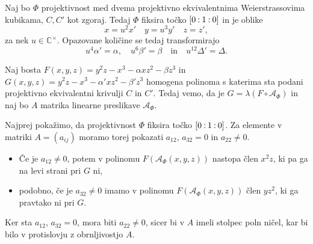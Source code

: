 \documentclass[mat1]{fmfdelo}
\newcommand{\CM}{\mathbb C ^\times}
\newcommand{\linphi}{\mathcal{A}_\Phi}
\newcommand{\oio}{\pcoor{0: 1 : 0}}
\newcommand{\pcoor}[1]{%
  \begingroup\lccode`~=`: \lowercase{\endgroup
  \edef~}{\mathbin{\mathchar\the\mathcode`:}\nobreak}%
  [%
  \begingroup
  \mathcode`:=\string"8000
  #1%
  \endgroup
  ]%
}
\theoremstyle{definition}
\begin{document}
\begin{lema}
    \label{projektivnosti wnf}
    Naj bo $\Phi$ projektivnost med dvema projektivno ekvivalentnima Weierstrassovima kubikama, $C, C'$ kot zgoraj. Tedaj $\Phi$ fiksira točko $\pcoor{0 : 1 : 0}$ in je oblike 
    \begin{equation}
        \label{eq:transformacija wnf}
        x = u^2 x' \quad y = u^3 y' \quad z = z',  
    \end{equation}
    za nek $u \in \CM$. Opazovane količine se tedaj transformirajo 
    \[
        u^4 \alpha' = \alpha, \quad u^6 \beta' = \beta \quad \text{in} \quad u^{12} \Delta' = \Delta.
    \]
\end{lema}

\begin{dokaz}
    Naj bosta $F(x,y,z) = y^2z - x^3 - \alpha xz^2 - \beta z^3$ in $G(x, y, z) = y^2z - x^3 - \alpha' xz^2 - \beta' z^3$ homogena polinoma s katerima sta podani projektivno ekvivalentni krivulji $C$ in $C'$. Tedaj vemo, da je $G = \lambda(F \circ \linphi)$ in naj bo $A$ matrika linearne preslikave $\linphi$.
    
    Najprej pokažimo, da projektivnost $\Phi$ fiksira točko $\oio$. Za elemente v matriki $A = (a_{ij})$ moramo torej pokazati $a_{12}$, $a_{32} = 0$ in $a_{22} \neq 0$. 
    \begin{itemize}
        \item Če je $a_{12} \neq 0$, potem v polinomu $F(\linphi(x,y,z))$ nastopa člen $x^2z$, ki pa ga na levi strani pri $G$ ni, 
        \item podobno, če je $a_{32} \neq 0$ imamo v polinomu $F(\linphi(x,y,z))$ člen $yz^2$, ki ga pravtako ni pri $G$. 
    \end{itemize}
    Ker sta $a_{12}$, $a_{32} = 0$, mora biti $a_{22} \neq 0$, sicer bi v $A$ imeli stolpec poln ničel, kar bi bilo v protislovju z obrnljivostjo $A$. 
    

\end{dokaz}
\end{document}
